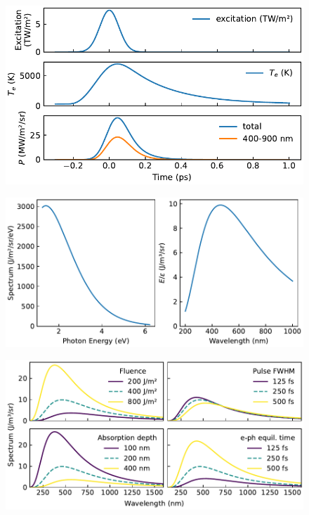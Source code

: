 \documentclass[
	parskip=half,
	a4paper,
]{scrarticle}
\begin{document}
\begin{figure}[h]
    \centering
    \includegraphics{../analysis/figures/model.time_evolution.pdf}
    \label{fig:timeevolution}
    \caption{}
\end{figure}
\begin{figure}[h]
    \centering
    \includegraphics{../analysis/figures/model.spectrum.pdf}
    \label{fig:model_spectrum}
    \caption{}
\end{figure}
\begin{figure}[h]
    \centering
    \includegraphics{../analysis/figures/sensitivity.pdf}
    \label{fig:sensitivity}
    \caption{}
\end{figure}
\end{document}
